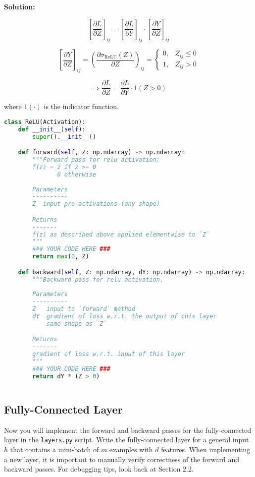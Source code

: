 \documentclass{article}
\newenvironment{solution}{\color{blue} \smallskip \textbf{Solution:}}{}
\begin{document}
\begin{solution}

\[
\left[ \frac{\partial L}{\partial Z} \right]_{ij} = \left[ \frac{\partial L}{\partial Y} \right]_{ij} \cdot \left[ \frac{\partial Y}{\partial Z} \right]_{ij}
\]

\[
\left[ \frac{\partial Y}{\partial Z} \right]_{ij} = \left( \frac{\partial \sigma_{\text{ReLU}}(Z)}{\partial Z} \right)_{ij} = 
\begin{cases}
0, & Z_{ij} \leq 0 \\
1, & Z_{ij} > 0
\end{cases}
\]

\[
\Rightarrow \frac{\partial L}{\partial Z} = \frac{\partial L}{\partial Y} \cdot 1(Z > 0)
\]

where \( 1(\cdot) \) is the indicator function.

    \begin{lstlisting}[language=Python]
class ReLU(Activation):
    def __init__(self):
        super().__init__()

    def forward(self, Z: np.ndarray) -> np.ndarray:
        """Forward pass for relu activation:
        f(z) = z if z >= 0
               0 otherwise
        
        Parameters
        ----------
        Z  input pre-activations (any shape)

        Returns
        -------
        f(z) as described above applied elementwise to `Z`
        """
        ### YOUR CODE HERE ###
        return max(0, Z)

    def backward(self, Z: np.ndarray, dY: np.ndarray) -> np.ndarray:
        """Backward pass for relu activation.
        
        Parameters
        ----------
        Z   input to `forward` method
        dY  gradient of loss w.r.t. the output of this layer
            same shape as `Z`

        Returns
        -------
        gradient of loss w.r.t. input of this layer
        """
        ### YOUR CODE HERE ###
        return dY * (Z > 0)
        
	\end{lstlisting}

\end{solution}

\newpage
\subsection{Fully-Connected Layer}
Now you will implement the forward and backward passes for the fully-connected layer in the \texttt{layers.py} script. 
Write the fully-connected layer for a general input $h$ that contains a mini-batch of $m$ examples with $d$ features. 
When implementing a new layer, it is important to manually verify correctness of the forward and backward passes. For debugging tips, look back at Section 2.2.
\end{document}
